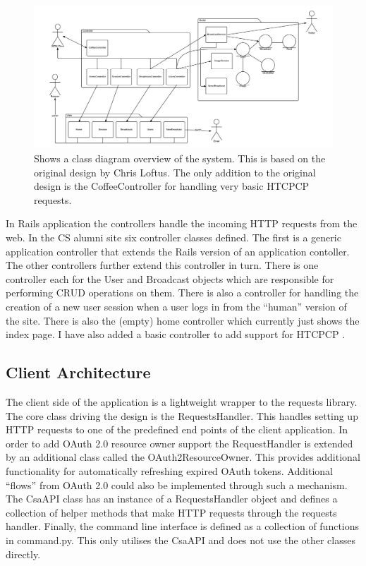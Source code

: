 \documentclass[paper=a4, fontsize=11pt]{scrartcl}	%
\numberwithin{equation}{section}															%
\numberwithin{figure}{section}																%
\numberwithin{table}{section}
\begin{document}
\begin{figure}[H]
\centering
\includegraphics[width=1.1\textwidth]{img/entity_relationship.png}
\caption{Shows a class diagram overview of the system. This is based on the original design by Chris Loftus. The only addition to the original design is the CoffeeController for handling very basic HTCPCP requests.}
\label{fig:entity-realtionship}
\end{figure}


In Rails application the controllers handle the incoming HTTP requests from the web. In the CS alumni site six controller classes defined. The first is a generic application controller that extends the Rails version of an application contoller. The other controllers further extend this controller in turn. There is one controller each for the User and Broadcast objects which are responsible for performing CRUD operations on them. There is also a controller for handling the creation of a new user session when a user logs in from the ``human'' version of the site. There is also the (empty) home controller which currently just shows the index page. I have also added a basic controller to add support for HTCPCP \cite{rfc2324htcpcp}.

\subsection{Client Architecture}
\label{subsec:client-architecture}
The client side of the application is a lightweight wrapper to the requests library. The core class driving the design is the RequestsHandler. This handles setting up HTTP requests to one of the predefined end points of the client application. In order to add OAuth 2.0 resource owner support the RequestHandler is extended by an additional class called the OAuth2ResourceOwner. This provides additional functionality for automatically refreshing expired OAuth tokens. Additional ``flows'' from OAuth 2.0 could also be implemented through such a mechanism. The CsaAPI class has an instance of a RequestsHandler object and defines a collection of helper methods that make HTTP requests through the requests handler. Finally, the command line interface is defined as a collection of functions in command.py. This only utilises the CsaAPI and does not use the other classes directly.
\end{document}
